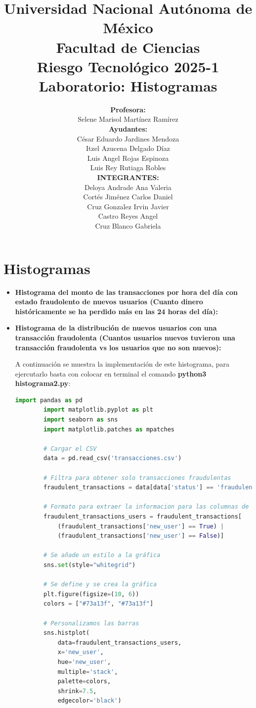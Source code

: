 \documentclass{article}
\title{Universidad Nacional Autónoma de México \\\bigskip Facultad de Ciencias \\\bigskip Riesgo Tecnológico 2025-1 \\\bigskip \textbf{Laboratorio: Histogramas}}
\author{\textbf{Profesora:} \\\bigskip Selene Marisol Martínez Ramírez \\\bigskip \textbf{Ayudantes:} \\\bigskip  César Eduardo Jardines Mendoza \\\bigskip Itzel Azucena Delgado Díaz \\\bigskip Luis Angel Rojas Espinoza \\\bigskip Luis Rey Rutiaga Robles \\\bigskip \textbf{INTEGRANTES:} \\\bigskip Deloya Andrade Ana Valeria \\\bigskip Cortés Jiménez Carlos Daniel \\\bigskip Cruz Gonzalez Irvin Javier \\\bigskip Castro Reyes Angel \\\bigskip Cruz Blanco Gabriela}
\begin{document}
\maketitle

\newpage
 
\section{Histogramas}

\begin{itemize}
    \item \textbf{Histograma del monto de las transacciones por hora del día con estado fraudolento de nuevos usuarios (Cuanto dinero históricamente se ha perdido más en las 24 horas del día):}

    \item \textbf{Histograma de la distribución de nuevos usuarios con una transacción fraudolenta (Cuantos usuarios nuevos tuvieron una transacción fraudolenta vs los usuarios que no son nuevos):}

    A continuación se muestra la implementación de este histograma, para ejercutarlo basta con colocar en terminal el comando \textbf{python3 histograma2.py}:

    \begin{lstlisting}[language=Python, caption=Implementación DES(Data Encryption Standard)]
        import pandas as pd
        import matplotlib.pyplot as plt
        import seaborn as sns
        import matplotlib.patches as mpatches
        
        # Cargar el CSV
        data = pd.read_csv('transacciones.csv')
        
        # Filtra para obtener solo transacciones fraudulentas
        fraudulent_transactions = data[data['status'] == 'fraudulent']
        
        # Formato para extraer la informacion para las columnas de los usuarios no nuevos y nuevos
        fraudulent_transactions_users = fraudulent_transactions[
            (fraudulent_transactions['new_user'] == True) | 
            (fraudulent_transactions['new_user'] == False)]
        
        # Se añade un estilo a la gráfica
        sns.set(style="whitegrid")
        
        # Se define y se crea la gráfica
        plt.figure(figsize=(10, 6)) 
        colors = ["#73a13f", "#73a13f"]
        
        # Personalizamos las barras
        sns.histplot(
            data=fraudulent_transactions_users, 
            x='new_user', 
            hue='new_user',  
            multiple='stack', 
            palette=colors,
            shrink=7.5,  
            edgecolor='black')
        

\end{lstlisting}
\end{itemize}
\end{document}
